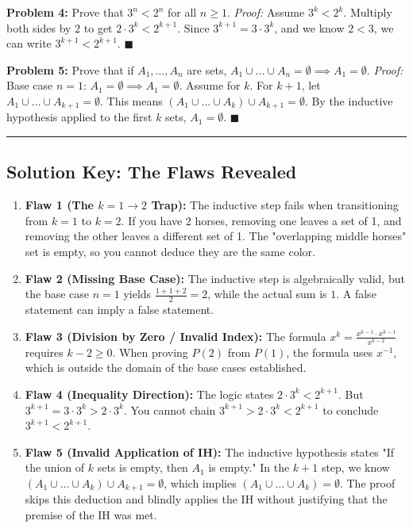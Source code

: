 \documentclass[11pt, a4paper]{article}
\theoremstyle{definition}
\theoremstyle{remark}
\begin{document}
\textbf{Problem 4:} Prove that $3^n < 2^n$ for all $n \ge 1$.
\textit{Proof:} Assume $3^k < 2^k$. Multiply both sides by $2$ to get $2 \cdot 3^k < 2^{k+1}$. Since $3^{k+1} = 3 \cdot 3^k$, and we know $2 < 3$, we can write $3^{k+1} < 2^{k+1}$. $\blacksquare$

\textbf{Problem 5:} Prove that if $A_1, \dots, A_n$ are sets, $A_1 \cup \dots \cup A_n = \emptyset \implies A_1 = \emptyset$.
\textit{Proof:} Base case $n=1$: $A_1 = \emptyset \implies A_1 = \emptyset$. Assume for $k$. For $k+1$, let $A_1 \cup \dots \cup A_{k+1} = \emptyset$. This means $(A_1 \cup \dots \cup A_k) \cup A_{k+1} = \emptyset$. By the inductive hypothesis applied to the first $k$ sets, $A_1 = \emptyset$. $\blacksquare$

\vspace{10pt}
\hrule
\vspace{10pt}
\subsection*{Solution Key: The Flaws Revealed}
\begin{enumerate}
    \item \textbf{Flaw 1 (The $k=1 \to 2$ Trap):} The inductive step fails when transitioning from $k=1$ to $k=2$. If you have 2 horses, removing one leaves a set of 1, and removing the other leaves a different set of 1. The "overlapping middle horses" set is empty, so you cannot deduce they are the same color.
    \item \textbf{Flaw 2 (Missing Base Case):} The inductive step is algebraically valid, but the base case $n=1$ yields $\frac{1+1+2}{2} = 2$, while the actual sum is $1$. A false statement can imply a false statement.
    \item \textbf{Flaw 3 (Division by Zero / Invalid Index):} The formula $x^k = \frac{x^{k-1} \cdot x^{k-1}}{x^{k-2}}$ requires $k-2 \ge 0$. When proving $P(2)$ from $P(1)$, the formula uses $x^{-1}$, which is outside the domain of the base cases established.
    \item \textbf{Flaw 4 (Inequality Direction):} The logic states $2 \cdot 3^k < 2^{k+1}$. But $3^{k+1} = 3 \cdot 3^k > 2 \cdot 3^k$. You cannot chain $3^{k+1} > 2 \cdot 3^k < 2^{k+1}$ to conclude $3^{k+1} < 2^{k+1}$.
    \item \textbf{Flaw 5 (Invalid Application of IH):} The inductive hypothesis states "If the union of $k$ sets is empty, then $A_1$ is empty." In the $k+1$ step, we know $(A_1 \cup \dots \cup A_k) \cup A_{k+1} = \emptyset$, which implies $(A_1 \cup \dots \cup A_k) = \emptyset$. The proof skips this deduction and blindly applies the IH without justifying that the premise of the IH was met.
\end{enumerate}
\end{document}
